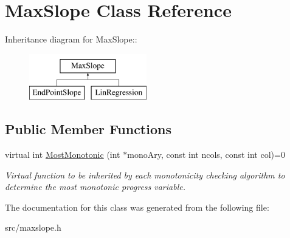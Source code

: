 \hypertarget{classMaxSlope}{
\section{MaxSlope Class Reference}
\label{d0/d39/classMaxSlope}
}
Inheritance diagram for MaxSlope::\begin{figure}[H]
\begin{center}
\leavevmode
\includegraphics[height=2cm]{d0/d39/classMaxSlope}
\end{center}
\end{figure}
\subsection*{Public Member Functions}
\begin{DoxyCompactItemize}
\item 
\hypertarget{classMaxSlope_a494b1b1ae073d3b29fe7cdc023ce7861}{
virtual int \hyperlink{classMaxSlope_a494b1b1ae073d3b29fe7cdc023ce7861}{MostMonotonic} (int $\ast$monoAry, const int ncols, const int col)=0}
\label{d0/d39/classMaxSlope_a494b1b1ae073d3b29fe7cdc023ce7861}

\begin{DoxyCompactList}\small\item\em Virtual function to be inherited by each monotonicity checking algorithm to determine the most monotonic progress variable. \item\end{DoxyCompactList}\end{DoxyCompactItemize}


The documentation for this class was generated from the following file:\begin{DoxyCompactItemize}
\item 
src/maxslope.h\end{DoxyCompactItemize}
